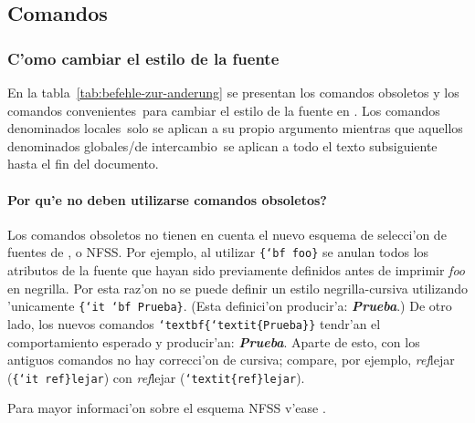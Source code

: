 \documentclass[11pt,a4paper,pagesize,tablecaptionabove,abstracton,pointlessnumbers]{scrartcl}
\newcommand{\gl}{\guillemotleft}
\newcommand{\gr}{\guillemotright}
\newcommand{\qd}{\textquestiondown}
\DeclareRobustCommand*{\Macro}[1]{\mbox{\texttt{\char`\\#1}}}
\DeclareRobustCommand*{\LMacro}[2]{\mbox{\texttt{\char`\\#1\{#2\}}}}
\DeclareRobustCommand*{\GMacro}[2]{\mbox{\texttt{\{\char`\\#1\ #2\}}}}
\begin{document}
\subsection{Comandos}
\label{sec:befehle}

\subsubsection{C'omo cambiar el estilo de la fuente}
\label{sec:ander-des-schr}
En la tabla~\vref{tab:befehle-zur-anderung} se presentan los comandos obsoletos y los comandos \gl convenientes\gr\ para cambiar el estilo de la fuente en \LaTeXe. Los comandos denominados \gl locales\gr\ solo se aplican a su propio argumento mientras que aquellos denominados \gl globales/de intercambio\gr\ se aplican a todo el texto subsiguiente hasta el fin del documento. 

\paragraph{\qd Por qu'e no deben utilizarse comandos obsoletos?}
\label{sec:warum-sollte-man}

Los comandos obsoletos no tienen en cuenta el nuevo esquema de selecci'on de fuentes de \LaTeXe, o NFSS. Por ejemplo, al utilizar \GMacro{bf}{foo} se anulan todos los atributos de la fuente que hayan sido previamente definidos antes de imprimir \emph{foo} en negrilla. Por esta raz'on no se puede definir un estilo negrilla-cursiva utilizando 'unicamente
\GMacro{it}{\Macro{bf Prueba}}. (Esta definici'on producir'a:
{\it\bf Prueba}.) De otro lado, los nuevos comandos \LMacro{textbf}{\LMacro{textit}{Prueba}} tendr'an el comportamiento esperado y producir'an: \textbf{\textit{Prueba}}. Aparte de esto, con los antiguos comandos no hay \gl correcci'on de cursiva\gr; compare, por ejemplo, {\it
  ref}lejar (\GMacro{it}{ref}\texttt{lejar}) con
\textit{ref}lejar (\LMacro{textit}{ref}\texttt{lejar}).

Para mayor informaci'on sobre el esquema NFSS v'ease \cite{fntguide}.
\end{document}

